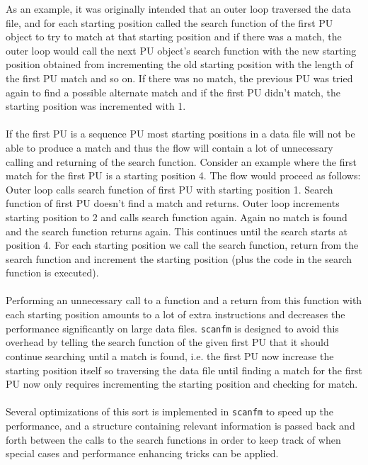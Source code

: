 \documentclass[12pt]{article}
\newcommand{\sfm}{\texttt{scanfm} }
\newcommand{\pu}{PU }
\begin{document}
\noindent As an example, it was originally intended that an outer loop traversed the data file, 
and for each starting position called the search function of the first \pu object to try to match
at that starting position and if there was a match, the outer loop would call the next \pu object's search function
with the new starting position obtained from incrementing the old starting position with the length of the first \pu match
and so on. If there was no match, the previous \pu was tried again to find a possible alternate match and if 
the first \pu didn't match, the starting position was incremented with 1. \\ \\
If the first \pu is a sequence \pu most starting positions in a data file will not be able to produce a match
and thus the flow will contain a lot of unnecessary calling and returning of the search function. Consider
an example where the first match for the first \pu is a starting position 4. The flow would proceed as follows: \\
Outer loop calls search function of first \pu with starting position 1. Search function of first \pu doesn't find a match
and returns. Outer loop increments starting position to 2 and calls search function again. Again no match is found
and the search function returns again. This continues until the search starts at position 4. For each starting position
we call the search function, return from the search function and increment the starting position (plus the code
in the search function is executed). \\ \\
Performing an unnecessary call to a function and a return from this function with each starting position amounts
to a lot of extra instructions and decreases the performance significantly on large data files. 
\sfm is designed to avoid this overhead by telling the search function of the given first \pu that it should
continue searching until a match is found, i.e. the first \pu now increase the starting position itself so 
traversing the data file until finding a match for the first \pu now only requires incrementing the starting position
and checking for match. \\ \\
Several optimizations of this sort is implemented in \sfm to speed up the performance, and a structure containing relevant
information is passed back and forth between the calls to the search functions in order to keep track of when special
cases and performance enhancing tricks can be applied. \\ \\
\end{document}
